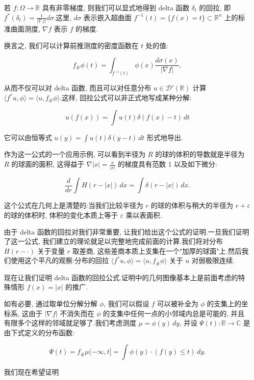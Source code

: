 \begin{example*}
若 $f : \Omega\to\mathbb{R}$ 具有非零梯度, 则我们可以显式地得到 delta 函数 $\delta_t$ 的回拉, 即 $f^*(\delta_t) = \frac{1}{|\nabla f|}d\sigma$.这里, $d\sigma$ 表示嵌入超曲面 $f^{-1}(t) = \{f(x) = t\}\subset\mathbb{R}^n$ 上的标准曲面测度, $\nabla f$ 表示 $f$ 的梯度.

换言之, 我们可以计算前推测度的密度函数在 $t$ 处的值:

\[
f_{\#}\phi(t) = \int_{f^{-1}(t)}\phi(x)\frac{d\sigma(x)}{|\nabla f|},
\]

从而不仅可以对 delta 函数, 而且可以对任意分布 $u\in\mathcal{D}'(\mathbb{R})$ 计算 $\langle f^*u, \phi\rangle = \langle u, f_{\#}\phi\rangle$.这样, 回拉公式可以非正式地写成某种分解:

\[
u(f(x)) = \int u(t)\delta(f(x)-t)\, dt
\]

它可以由恒等式 $u(y) = \int u(t)\delta(y-t)\, dt$ 形式地导出.

作为这一公式的一个应用示例, 可以看到半径为 $R$ 的球的体积的导数就是半径为 $R$ 的球面的面积, 这得益于 $\nabla|x| = \frac{x}{|x|}$ 的梯度具有范数 1 以及如下微分:

\[
\frac{d}{dr}\int H(r-|x|)\, dx = \int\delta(r-|x|)\, dx.
\]

这个公式在几何上是清楚的:当我们比较半径为 $r$ 的球的体积与稍大的半径为 $r+\varepsilon$ 的球的体积时, 体积的变化本质上等于 $\varepsilon$ 乘以表面积.
\end{example*}

由于 delta 函数的回拉对我们非常重要, 让我们给出这个公式的证明.一旦我们证明了这一公式, 我们建立的理论就足以完整地完成前面的计算.我们将对分布 $H(r-\cdot)$ 关于变量 $r$ 取差商, 这些差商本质上支集在一个"加厚的球面"上.然后我们使用这个平凡的观察:分布的回拉 $\langle f^*u, \phi\rangle = \langle u, f_{\#}\phi\rangle$ 关于 $u$ 对弱极限连续.

现在让我们证明 delta 函数的回拉公式.证明中的几何图像基本上是前面考虑的特殊情形 $f(x) = |x|$ 的推广.


如有必要, 通过取单位分解分解 $\phi$, 我们可以假设 $f$ 可以被补全为 $\phi$ 的支集上的坐标系, 这由于 $|\nabla f|$ 不消失而在 $\phi$ 的支集中任何一点的小邻域内总是可能的, 并且有限多个这样的邻域就足够了.我们考虑测度 $\mu = \phi(y)\, dy$, 并设 $\Psi(t) : \mathbb{R}\to\mathbb{C}$ 是由下式定义的分布函数:

\[
\Psi(t) = f_{\#}\mu(-\infty, t] = \int\phi(y)\cdot(f(y)\leq t)\, dy.
\]

我们现在希望证明

